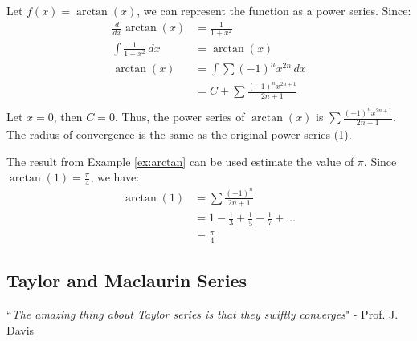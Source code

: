 \documentclass[11pt]{report}
\begin{document}
\begin{example}\label{ex:arctan}
    Let $f(x) = \arctan(x)$, we can represent the function as a power series. Since:
    \begin{align*}
        \frac{d}{dx} \arctan(x) &= \frac{1}{1+x^2} \\
        \int \frac{1}{1+x^2} \, dx &= \arctan(x) \\
        \arctan(x) &= \int \sum (-1)^n x^{2n} \, dx \\
        &= C + \sum \frac{(-1)^n x^{2n+1}}{2n+1} \\
    \end{align*}
    Let $x=0$, then $C = 0$. Thus, the power series of $\arctan(x)$ is $\sum \frac{(-1)^n x^{2n+1}}{2n+1}$. The radius of convergence is the same as the original power series (1). 
\end{example}
\begin{example}
    The result from Example \ref{ex:arctan} can be used estimate the value of $\pi$. Since $\arctan(1) = \frac{\pi}{4}$, we have:
    \begin{align*}
        \arctan(1) &= \sum \frac{(-1)^n}{2n+1} \\
        &= 1 - \frac{1}{3} + \frac{1}{5} - \frac{1}{7} + \ldots \\
        &= \frac{\pi}{4}
    \end{align*}
\end{example}
\subsection{Taylor and Maclaurin Series}
\begin{center}
    ``\textit{The amazing thing about Taylor series is that they swiftly converges}" - Prof. J. Davis
\end{center}
\end{document}
